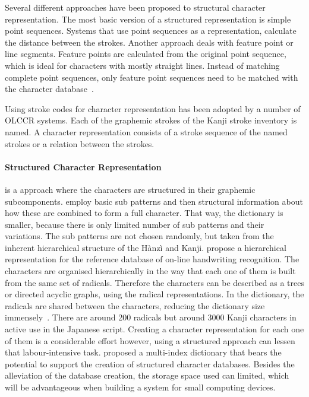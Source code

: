 Several different approaches have been proposed to structural character 
representation. The most basic version of a structured representation is simple
point sequences. Systems that use point sequences as a representation,
calculate the distance between the strokes. Another approach deals with feature 
point or line segments. Feature points are calculated from the original 
point sequence, which is ideal for characters with mostly straight lines. 
Instead of matching complete point sequences, only feature point sequences need 
to be matched with the character database~.

Using stroke codes for character representation has been adopted by a number of
OLCCR systems. Each of the graphemic strokes of the Kanji stroke inventory is
named. A character representation consists of a stroke sequence of the named
strokes or a relation between the strokes.

\paragraph{Structured Character Representation} 
is a approach where the characters are structured in their graphemic 
subcomponents.  employ basic sub patterns and then 
structural information about how these are combined to form a full character.
That way, the dictionary is smaller, because there is only limited number of 
sub patterns and their variations. The sub patterns are not chosen randomly,
but taken from the inherent hierarchical structure of the Hànzì and Kanji.
 propose a hierarchical representation for the 
reference database of on-line handwriting recognition.
The characters are organised hierarchically in the way that each one of them
is built from the same set of radicals. Therefore the characters can be 
described as a trees or directed acyclic graphs, using the radical 
representations. In the dictionary, the radicals are shared between the 
characters, reducing the dictionary size 
immensely~. 
There are around 200 radicals but around 3000 Kanji characters in active use in 
the Japanese script. Creating a character representation for each one of them 
is a considerable effort however, using a structured approach can lessen that 
labour-intensive task.  proposed a multi-index dictionary 
that bears the potential to support the creation of structured character 
databases. Besides the alleviation of the database creation, the storage space 
used can limited, which will be advantageous when building a system for small 
computing devices.

